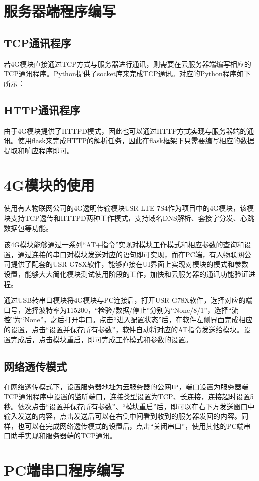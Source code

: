 \documentclass[a4paper,11pt]{ctexart}
\begin{document}
\begin{spacing}{1.5}
\section{服务器端程序编写}
\subsection{TCP通讯程序}
\par
若4G模块直接通过TCP方式与服务器进行通讯，则需要在云服务器端编写相应的TCP通讯程序。Python提供了socket库来完成TCP通讯。对应的Python程序如下所示：
\subsection{HTTP通讯程序}
\par
由于4G模块提供了HTTPD模式，因此也可以通过HTTP方式实现与服务器端的通讯。使用flask来完成HTTP的解析任务，因此在flask框架下只需要编写相应的数据提取和响应程序即可。



\section{4G模块的使用}
\par
使用有人物联网公司的4G透明传输模块USR-LTE-7S4作为项目中的4G模块，该模块支持TCP透传和HTTPD两种工作模式，支持域名DNS解析、套接字分发、心跳数据包等功能。
\par
该4G模块能够通过一系列“AT+指令”实现对模块工作模式和相应参数的查询和设置，通过连接的串口对模块发送对应的语句即可实现，而在PC端，有人物联网公司提供了配套的USR-G78X软件，能够直接在UI界面上实现对模块的模式和参数设置，能够大大简化模块测试使用阶段的工作，加快和云服务器的通讯功能验证进程。
\par
通过USB转串口模块将4G模块与PC连接后，打开USR-G78X软件，选择对应的端口号，选择波特率为115200，“检验/数据/停止”分别为“None/8/1”，选择“流控”为“None”，之后打开串口。点击“进入配置状态”后，在软件左侧界面完成相应的设置，点击“设置并保存所有参数”，软件自动将对应的AT指令发送给模块。设置完成后，点击模块重启，即可完成工作模式和参数的设置。
\subsection{网络透传模式}
\par
在网络透传模式下，设置服务器地址为云服务器的公网IP，端口设置为服务器端TCP通讯程序中设置的监听端口，连接类型设置为TCP、长连接，连接超时设置5秒。依次点击“设置并保存所有参数”、“模块重启”后，即可以在右下方发送窗口中输入发送的内容，点击发送后可以在右侧中间看到收到的服务器发回的内容。同样，也可以在完成网络透传模式的设置后，点击“关闭串口”，使用其他的PC端串口助手实现和服务器端的TCP通讯。


\section{PC端串口程序编写}








\end{spacing}


	
\end{document}
